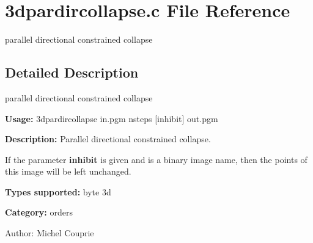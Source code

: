 \section{3dpardircollapse.c File Reference}
\label{3dpardircollapse_8c}
parallel directional constrained collapse  




\label{_details}
\subsection{Detailed Description}
parallel directional constrained collapse 

{\bf Usage:} 3dpardircollapse in.pgm nsteps [inhibit] out.pgm

{\bf Description:} Parallel directional constrained collapse.

If the parameter {\bf inhibit} is given and is a binary image name, then the points of this image will be left unchanged.

{\bf Types supported:} byte 3d

{\bf Category:} orders

\begin{Desc}
\item[Author:]Michel Couprie \end{Desc}

